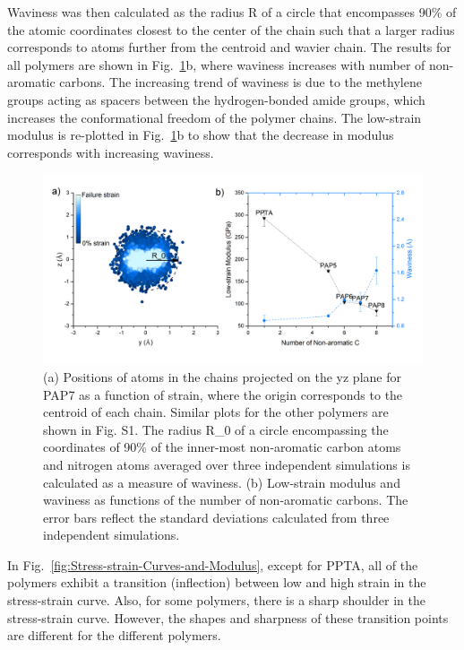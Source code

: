 \documentclass[journal=langd5,manuscript=article]{achemso}
\begin{document}
Waviness was then calculated as the radius R of a circle that encompasses 90\% of the atomic coordinates closest to the center of the chain such that a larger radius corresponds to atoms further from the centroid and wavier chain.
The results for all polymers are shown in Fig.~\ref{fig:SideView-Waviness-and-Low-strain-Modulus}b, where waviness increases with number of non-aromatic carbons.
The increasing trend of waviness is due to the methylene groups acting as spacers between the hydrogen-bonded amide groups, which increases the conformational freedom of the polymer chains.
The low-strain modulus is re-plotted in Fig.~\ref{fig:SideView-Waviness-and-Low-strain-Modulus}b to show that the decrease in modulus corresponds with increasing waviness.

\begin{figure}[h!]
\centering
\includegraphics[scale=0.55]{SideView-Waviness-and-Low-strain-Modulus.png}
\caption{(a) Positions of atoms in the chains projected on the yz plane for PAP7 as a function of strain, where the origin corresponds to the centroid of each chain. Similar plots for the other polymers are shown in Fig. S1. The radius R\_0 of a circle encompassing the coordinates of 90\% of the inner-most non-aromatic carbon atoms and nitrogen atoms averaged over three independent simulations is calculated as a measure of waviness. (b) Low-strain modulus and waviness as functions of the number of non-aromatic carbons. The error bars reflect the standard deviations calculated from three independent simulations.}
\label{fig:SideView-Waviness-and-Low-strain-Modulus}
\end{figure}

In Fig.~\ref{fig:Stress-strain-Curves-and-Modulus}, except for PPTA, all of the polymers exhibit a transition (inflection) between low and high strain in the stress-strain curve.
Also, for some polymers, there is a sharp shoulder in the stress-strain curve.
However, the shapes and sharpness of these transition points are different for the different polymers.
\end{document}
